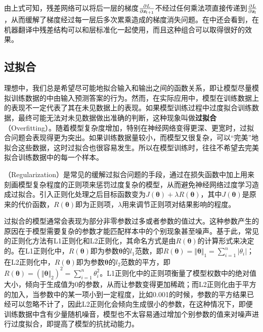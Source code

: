 \begin{itemize}
由上式可知，残差网络可以将后一层的梯度$ \frac{\partial L}{\partial {\textbf{\em x}}_{l+1}} $不经过任何乘法项直接传递到$ \frac{\partial L}{\partial {\textbf{\em x}}_l} $，从而缓解了梯度经过每一层后多次累乘造成的梯度消失问题。在{\chaptertwelve}中还会看到，在机器翻译中残差结构可以和层标准化一起使用，而且这种组合可以取得很好的效果。

\end{itemize}


\subsection{过拟合}\label{sec:9.4.5}

\parinterval  理想中，我们总是希望尽可能地拟合输入和输出之间的函数关系，即让模型尽量模拟训练数据的中由输入预测答案的行为。然而，在实际应用中，模型在训练数据上的表现不一定代表了其在未见数据上的表现。如果模型训练过程中过度拟合训练数据，最终可能无法对未见数据做出准确的判断，这种现象叫做{\small\sffamily\bfseries{过拟合}}（Overfitting）。随着模型复杂度增加，特别在神经网络变得更深、更宽时，过拟合问题会表现得更为突出。如果训练数据量较小，而模型又很复杂，可以“完美”地拟合这些数据，这时过拟合也很容易发生。所以在模型训练时，往往不希望去完美拟合训练数据中的每一个样本。

（Regularization）是常见的缓解过拟合问题的手段，通过在损失函数中加上用来刻画模型复杂程度的正则项来惩罚过度复杂的模型，从而避免神经网络过度学习造成过拟合。引入正则化处理之后目标函数变为$ J({\bm \theta})+\lambda R({\bm \theta}) $，其中$ J({\bm \theta}) $是原来的代价函数，$ R({\bm \theta}) $即为正则项，$ \lambda $用来调节正则项对结果影响的程度。

\parinterval  过拟合的模型通常会表现为部分非零参数过多或者参数的值过大。这种参数产生的原因在于模型需要复杂的参数才能匹配样本中的个别现象甚至噪声。基于此，常见的正则化方法有L1正则化和L2正则化，其命名方式是由$ R({\bm \theta}) $的计算形式来决定的。在L1正则化中，$ R({\bm \theta}) $即为参数$ {\bm \theta} $的$ l_1 $范数，即$ R({\bm \theta}) ={\Vert {\bm \theta}\Vert}_1=\sum\limits_{i=1}^{n}{\vert \theta_i\vert} $；在L2正则化中，$ R(\bm \theta) $即为参数${\bm \theta} $的$ l_2 $范数的平方，即$ R(\bm \theta) =({\Vert {\bm \theta}\Vert}_2)^2=\sum\limits_{i=1}^{n}{\theta_i^2} $。L1正则化中的正则项衡量了模型权数中的绝对值大小，倾向于生成值为0的参数，从而让参数变得更加稀疏；而L2正则化由于平方的加入，当参数中的某一项小到一定程度，比如0.001的时候，参数的平方结果已经可以忽略不计了，因此L2正则化会倾向生成很小的参数，在这种情况下，即便训练数据中含有少量随机噪音，模型也不太容易通过增加个别参数的值来对噪声进行过度拟合，即提高了模型的抗扰动能力。

